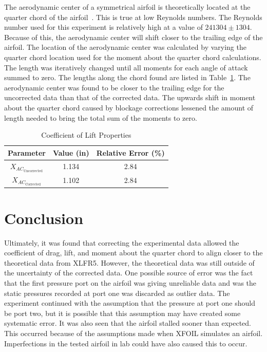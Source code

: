 \documentclass[journal,letterpaper]{IEEEtran}
\renewcommand{\arraystretch}{1.3}
\begin{document}
The aerodynamic center of a symmetrical airfoil is theoretically located at the quarter chord of the airfoil~\cite{Symmetrical}.
This is true at low Reynolds numbers.
The Reynolds number used for this experiment is relatively high at a value of $241304 \pm 1304$.
Because of this, the aerodynamic center will shift closer to the trailing edge of the airfoil.
The location of the aerodynamic center was calculated by varying the quarter chord location used for the moment about the quarter chord calculations.
The length was iteratively changed until all moments for each angle of attack summed to zero.
The lengths along the chord found are listed in Table~\ref{tab:center}.
The aerodynamic center was found to be closer to the trailing edge for the uncorrected data than that of the corrected data.
The upwards shift in moment about the quarter chord caused by blockage corrections lessened the amount of length needed to bring the total sum of the moments to zero.

\begin{table}[H]
    \centering
    \caption{Coefficient of Lift Properties}
    \renewcommand{\arraystretch}{1.2}
    \begin{tabular}{ccc}
    \toprule
    Parameter & Value (in) & Relative Error (\%) \\ \midrule \midrule
    $X_{AC_\text{Uncorrected}}$ & 1.134 & 2.84 \\
    $X_{AC_\text{Corrected}}$ & 1.102 & 2.84 \\ \bottomrule
    \end{tabular}
    \label{tab:center}
\end{table}


\section{Conclusion}


Ultimately, it was found that correcting the experimental data allowed the coefficient of drag, lift, and moment about the quarter chord to align closer to the theoretical data from XLFR5.
However, the theoretical data was still outside of the uncertainty of the corrected data.
One possible source of error was the fact that the first pressure port on the airfoil was giving unreliable data and was the static pressures recorded at port one was discarded as outlier data.
The experiment continued with the assumption that the pressure at port one should be port two, but it is possible that this assumption may have created some systematic error.
It was also seen that the airfoil stalled sooner than expected.
This occurred because of the assumptions made when XFOIL simulates an airfoil.
Imperfections in the tested airfoil in lab could have also caused this to occur.
\end{document}
